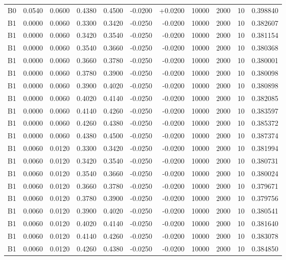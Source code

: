 \documentclass{article}
\begin{document}
\begin{longtable}{l r r r r r r r r r l}
B0 & 0.0540 & 0.0600 & 0.4380 & 0.4500 & -0.0200 & +0.0200 & 10000 & 2000 & 10 & 0.398840 \\
B1 & 0.0000 & 0.0060 & 0.3300 & 0.3420 & -0.0250 & -0.0200 & 10000 & 2000 & 10 & 0.382607 \\
B1 & 0.0000 & 0.0060 & 0.3420 & 0.3540 & -0.0250 & -0.0200 & 10000 & 2000 & 10 & 0.381154 \\
B1 & 0.0000 & 0.0060 & 0.3540 & 0.3660 & -0.0250 & -0.0200 & 10000 & 2000 & 10 & 0.380368 \\
B1 & 0.0000 & 0.0060 & 0.3660 & 0.3780 & -0.0250 & -0.0200 & 10000 & 2000 & 10 & 0.380001 \\
B1 & 0.0000 & 0.0060 & 0.3780 & 0.3900 & -0.0250 & -0.0200 & 10000 & 2000 & 10 & 0.380098 \\
B1 & 0.0000 & 0.0060 & 0.3900 & 0.4020 & -0.0250 & -0.0200 & 10000 & 2000 & 10 & 0.380898 \\
B1 & 0.0000 & 0.0060 & 0.4020 & 0.4140 & -0.0250 & -0.0200 & 10000 & 2000 & 10 & 0.382085 \\
B1 & 0.0000 & 0.0060 & 0.4140 & 0.4260 & -0.0250 & -0.0200 & 10000 & 2000 & 10 & 0.383597 \\
B1 & 0.0000 & 0.0060 & 0.4260 & 0.4380 & -0.0250 & -0.0200 & 10000 & 2000 & 10 & 0.385372 \\
B1 & 0.0000 & 0.0060 & 0.4380 & 0.4500 & -0.0250 & -0.0200 & 10000 & 2000 & 10 & 0.387374 \\
B1 & 0.0060 & 0.0120 & 0.3300 & 0.3420 & -0.0250 & -0.0200 & 10000 & 2000 & 10 & 0.381994 \\
B1 & 0.0060 & 0.0120 & 0.3420 & 0.3540 & -0.0250 & -0.0200 & 10000 & 2000 & 10 & 0.380731 \\
B1 & 0.0060 & 0.0120 & 0.3540 & 0.3660 & -0.0250 & -0.0200 & 10000 & 2000 & 10 & 0.380024 \\
B1 & 0.0060 & 0.0120 & 0.3660 & 0.3780 & -0.0250 & -0.0200 & 10000 & 2000 & 10 & 0.379671 \\
B1 & 0.0060 & 0.0120 & 0.3780 & 0.3900 & -0.0250 & -0.0200 & 10000 & 2000 & 10 & 0.379756 \\
B1 & 0.0060 & 0.0120 & 0.3900 & 0.4020 & -0.0250 & -0.0200 & 10000 & 2000 & 10 & 0.380541 \\
B1 & 0.0060 & 0.0120 & 0.4020 & 0.4140 & -0.0250 & -0.0200 & 10000 & 2000 & 10 & 0.381640 \\
B1 & 0.0060 & 0.0120 & 0.4140 & 0.4260 & -0.0250 & -0.0200 & 10000 & 2000 & 10 & 0.383078 \\
B1 & 0.0060 & 0.0120 & 0.4260 & 0.4380 & -0.0250 & -0.0200 & 10000 & 2000 & 10 & 0.384850 \\

\end{longtable}
\end{document}
